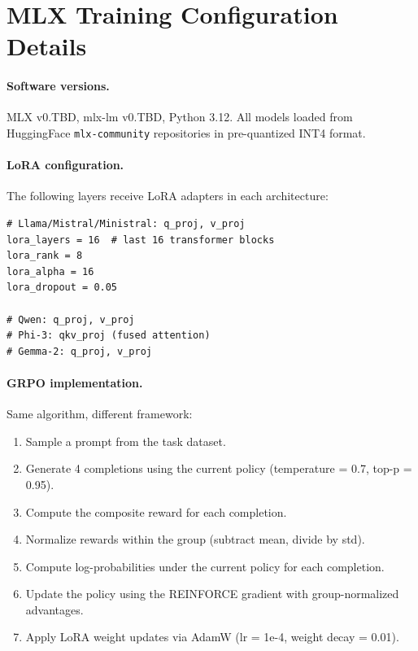 \documentclass[11pt]{article}
\begin{document}
\section{MLX Training Configuration Details}
\label{app:mlx-config}

\paragraph{Software versions.}  MLX v0.TBD, mlx-lm v0.TBD, Python 3.12.  All models loaded from HuggingFace \texttt{mlx-community} repositories in pre-quantized INT4 format.

\paragraph{LoRA configuration.} The following layers receive LoRA adapters in each architecture:

\begin{lstlisting}
# Llama/Mistral/Ministral: q_proj, v_proj
lora_layers = 16  # last 16 transformer blocks
lora_rank = 8
lora_alpha = 16
lora_dropout = 0.05

# Qwen: q_proj, v_proj
# Phi-3: qkv_proj (fused attention)
# Gemma-2: q_proj, v_proj
\end{lstlisting}

\paragraph{GRPO implementation.}  Same algorithm, different framework:

\begin{enumerate}[leftmargin=12pt]
    \item Sample a prompt from the task dataset.
    \item Generate 4 completions using the current policy (temperature = 0.7, top-p = 0.95).
    \item Compute the composite reward for each completion.
    \item Normalize rewards within the group (subtract mean, divide by std).
    \item Compute log-probabilities under the current policy for each completion.
    \item Update the policy using the REINFORCE gradient with group-normalized advantages.
    \item Apply LoRA weight updates via AdamW (lr = 1e-4, weight decay = 0.01).
\end{enumerate}
\end{document}
